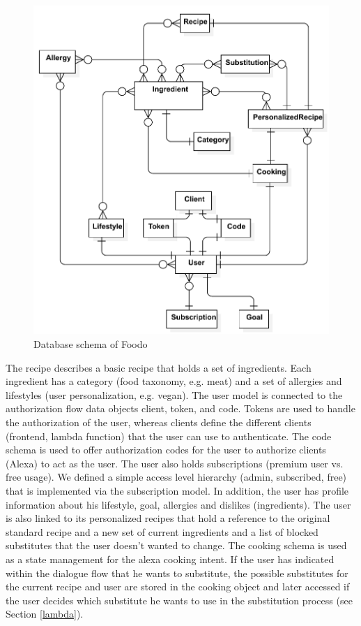 \begin{figure}[ht]
	\captionsetup{justification=centering}
	\begin{center}
		\includegraphics[scale=0.7]{Ressourcen/img/db}
		\caption{Database schema of Foodo}
	\end{center}
\end{figure}

The recipe describes a basic recipe that holds a set of ingredients. Each ingredient has a category (food taxonomy, e.g. meat) and a set of allergies and lifestyles (user personalization, e.g. vegan). The user model is connected to the authorization flow data objects client, token, and code. Tokens are used to handle the authorization of the user, whereas clients define the different clients (frontend, lambda function) that the user can use to authenticate. The code schema is used to offer authorization codes for the user to authorize clients (Alexa) to act as the user. The user also holds subscriptions (premium user vs. free usage). We defined a simple access level hierarchy (admin, subscribed, free) that is implemented via the subscription model. In addition, the user has profile information about his lifestyle, goal, allergies and dislikes (ingredients). The user is also linked to its personalized recipes that hold a reference to the original standard recipe and a new set of current ingredients and a list of blocked substitutes that the user doesn’t wanted to change. The cooking schema is used as a state management for the alexa cooking intent. If the user has indicated within the dialogue flow that he wants to substitute, the possible substitutes for the current recipe and user are stored in the cooking object and later accessed if the user decides which substitute he wants to use in the substitution process (see Section \ref{lambda}).
